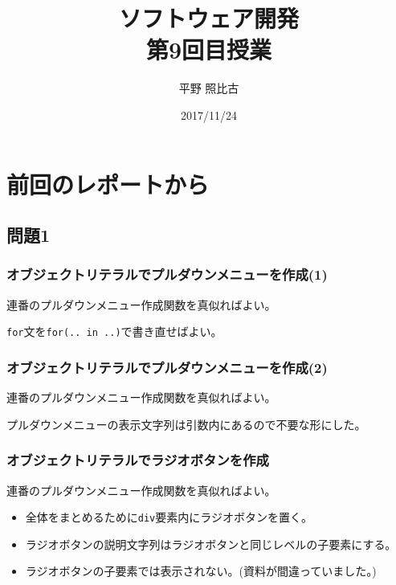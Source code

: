 
\title{ソフトウェア開発\\第9回目授業}
\author{平野 照比古}
\institute{}
\date{2017/11/24}
\newtheorem{Prob}{解説}
\newcommand{\Elm}[1]{\texttt{<#1>}}

\newcommand{\DOMM}{\texttt}
\newcommand{\Event}{\texttt}
\newcommand{\DOMP}{\texttt}
\newcommand{\DOM}{\texttt{DOM}}
\newcommand{\keyitem}{\relax}
\newcommand{\HTML}{HTML文書}

\frame{\maketitle}
\section{前回のレポートから}
\subsection{問題1}
 \begin{frame}[containsverbatim]
  \frametitle{オブジェクトリテラルでプルダウンメニューを作成(1)}
  連番のプルダウンメニュー作成関数を真似ればよい。

  \texttt{for}文を\texttt{for(.. in ..)}で書き直せばよい。
 \end{frame}
 \begin{frame}[containsverbatim]
  \frametitle{オブジェクトリテラルでプルダウンメニューを作成(2)}
  連番のプルダウンメニュー作成関数を真似ればよい。

  プルダウンメニューの表示文字列は引数内にあるので不要な形にした。
 \end{frame}
 \begin{frame}[containsverbatim]
  \frametitle{オブジェクトリテラルでラジオボタンを作成}
  連番のプルダウンメニュー作成関数を真似ればよい。

\begin{itemize}
 \item 全体をまとめるために\texttt{div}要素内にラジオボタンを置く。
 \item ラジオボタンの説明文字列はラジオボタンと同じレベルの子要素にする。
 \item ラジオボタンの子要素では表示されない。(資料が間違っていました。)
\end{itemize}
 \end{frame}
